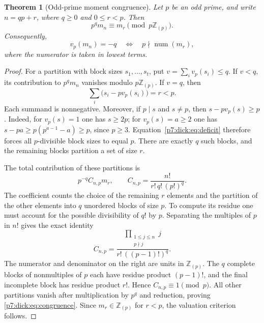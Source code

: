 \documentclass[11pt,a4paper]{article}
\newtheorem{theorem}{Theorem}[section]
\theoremstyle{definition}
\theoremstyle{remark}
\newcommand{\Z}{\mathbb Z}
\numberwithin{equation}{section}
\begin{document}
\begin{theorem}[Odd-prime moment congruence]\label{p7:dick:thm:congruence}
Let $p$ be an odd prime, and write $n=qp+r$, where $q\ge0$ and
$0\le r<p$.  Then
\begin{equation}\label{p7:dick:eq:congruence}
 p^q m_n\equiv m_r\pmod{p\Z_{(p)}}.
\end{equation}
Consequently,
\begin{equation}\label{p7:dick:eq:exact-valuation-test}
 v_p(m_n)=-q
 \quad\Longleftrightarrow\quad
 p\nmid\operatorname{num}(m_r),
\end{equation}
where the numerator is taken in lowest terms.
\end{theorem}
\begin{proof}
For a partition with block sizes $s_1,\ldots,s_t$, put
$v=\sum_i v_p(s_i)\le q$.  If $v<q$, its contribution to $p^q m_n$
vanishes modulo $p\Z_{(p)}$.  If $v=q$, then
\begin{equation}\label{p7:dick:eq:deficit}
 \sum_i\bigl(s_i-pv_p(s_i)\bigr)=r<p.
\end{equation}
Each summand is nonnegative.  Moreover, if $p\mid s$ and $s\ne p$, then
$s-pv_p(s)\ge p$.  Indeed, for $v_p(s)=1$ one has $s\ge2p$; for
$v_p(s)=a\ge2$ one has
$s-pa\ge p(p^{a-1}-a)\ge p$, since $p\ge3$.
Equation~\eqref{p7:dick:eq:deficit} therefore forces all $p$-divisible block
sizes to equal $p$.  There are exactly $q$ such blocks, and the remaining
blocks partition a set of size $r$.

The total contribution of these partitions is
\[
 p^{-q}C_{n,p}m_r,
 \qquad C_{n,p}=\frac{n!}{r!\,q!\,(p!)^q}.
\]
The coefficient counts the choice of the remaining $r$ elements and the
partition of the other elements into $q$ unordered blocks of size $p$.
To compute its residue one must account for the possible divisibility of
$q!$ by $p$.  Separating the multiples of $p$ in $n!$ gives the exact identity
\begin{equation}\label{p7:dick:eq:unit-factor}
 C_{n,p}=
 \frac{\displaystyle\prod_{\substack{1\le j\le n\\p\nmid j}}j}
      {r!\,((p-1)!)^q}.
\end{equation}
The numerator and denominator on the right are units in $\Z_{(p)}$.
The $q$ complete blocks of nonmultiples of $p$ each have residue product
$(p-1)!$, and the final incomplete block has residue product $r!$.
Hence $C_{n,p}\equiv1\pmod p$.  All other partitions vanish after
multiplication by $p^q$ and reduction, proving
\eqref{p7:dick:eq:congruence}.  Since $m_r\in\Z_{(p)}$ for $r<p$, the
valuation criterion follows.
\end{proof}
\end{document}
